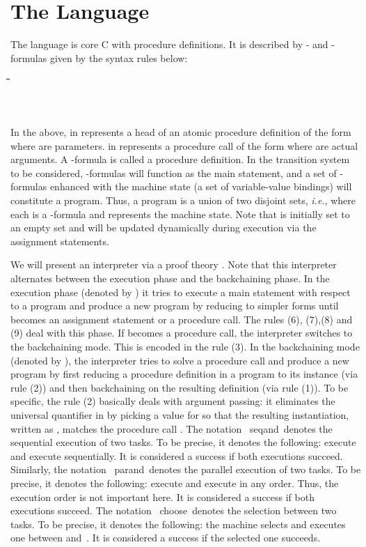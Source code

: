 \documentclass[letter]{ieice}
\newcommand{\ie}{{\em i.e.}}
\newenvironment{exmple}{
 \begingroup \begin{tabbing} \hspace{2em}\= \hspace{3em}\= \hspace{3em}\=
\hspace{3em}\= \hspace{3em}\= \hspace{3em}\= \kill}{
 \end{tabbing}\endgroup}
\begin{document}
\section{The Language}\label{sec:logic}

The language is   core C 
 with  procedure definitions. It is described
by - and -formulas given by the syntax rules below:
\begin{exmple}
\> \>    \\  
\>\>   \\
\> \>  \\
\end{exmple}
\noindent
 In the above, 
 in  represents a head of an atomic procedure definition of the form  
where  are parameters.  in  represents a procedure call
 of the form  
where  are actual arguments.
A -formula  is called a  procedure definition.
In the transition system to be considered, -formulas will function as the
main  statement, and a set of -formulas  enhanced with the
machine state (a set of variable-value bindings) will constitute  a program.
Thus, a program is a union of two disjoint sets, \ie, 
where each  is a -formula and  represents the machine state.
Note that  is initially set to an empty set and will be updated dynamically during execution
via the assignment statements. 

 We will  present an interpreter via a proof theory \cite{Khan87,MNPS91,HM94,MN12}.
Note that this interpreter  alternates between 
 the execution phase 
and the backchaining phase.  
In  the execution phase (denoted by ) it tries to execute a main statement  with respect to
a program  and
produce a new program 
by reducing  
to simpler forms until  becomes an assignment statement or a procedure call. The rules
 (6), (7),(8) and (9) deal with this phase.
If  becomes a procedure call, the interpreter switches to the backchaining mode. This is encoded in the rule (3). 
In the backchaining mode (denoted by ), the interpreter tries 
to solve a procedure call   and produce a new  program 
by first reducing a procedure definition  in a program  to  its instance
 (via rule (2)) and then backchaining on the resulting 
definition (via rule (1)).
 To be specific, the rule (2) basically deals with argument passing: it eliminates the universal quantifier  in 
by picking a value  for
 so that the resulting instantiation, written as , matches the procedure call .
The notation \ seqand\  denotes the  sequential execution of two tasks. To be precise, it denotes
the following: execute  and execute
 sequentially. It is considered a success if both executions succeed.
Similarly, the notation \ parand\  denotes the  parallel execution of two tasks. To be precise, it denotes
the following: execute  and execute
  in any order.  Thus, the execution order is not important here. 
It is considered a success if both executions succeed.
 The notation \ choose\  denotes the  selection between two tasks. To be precise, it denotes
the following: the machine selects and executes  one between   and\ .
 It is considered a success if the selected one succeeds.
\end{document}
